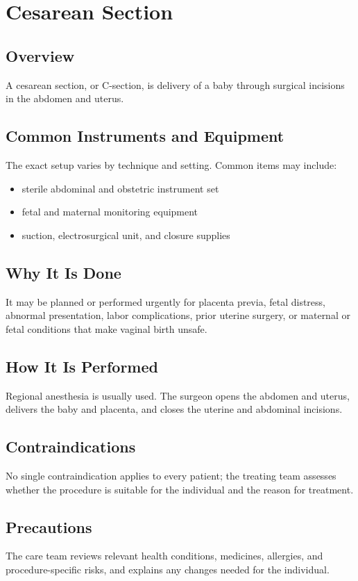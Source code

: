 \chapter{Cesarean Section}

\section*{Overview}
A cesarean section, or C-section, is delivery of a baby through surgical incisions in the abdomen and uterus.

\section*{Common Instruments and Equipment}
The exact setup varies by technique and setting. Common items may include:
\begin{itemize}[nosep,leftmargin=*]
  \item sterile abdominal and obstetric instrument set
  \item fetal and maternal monitoring equipment
  \item suction, electrosurgical unit, and closure supplies
\end{itemize}

\section*{Why It Is Done}
It may be planned or performed urgently for placenta previa, fetal distress, abnormal presentation, labor complications, prior uterine surgery, or maternal or fetal conditions that make vaginal birth unsafe.

\section*{How It Is Performed}
Regional anesthesia is usually used. The surgeon opens the abdomen and uterus, delivers the baby and placenta, and closes the uterine and abdominal incisions.

\section*{Contraindications}
No single contraindication applies to every patient; the treating team assesses whether the procedure is suitable for the individual and the reason for treatment.

\section*{Precautions}
The care team reviews relevant health conditions, medicines, allergies, and procedure-specific risks, and explains any changes needed for the individual.

